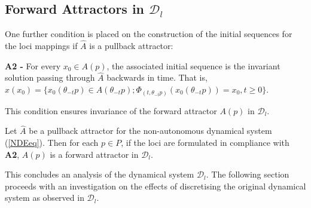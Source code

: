 \subsection{Forward Attractors in $\mathcal{D}_l$}

One further condition is placed on the construction of the initial sequences
for the loci mappings if $\hat{A}$ is a pullback attractor:

\textbf{A2 - } For every $x_0 \in A(p)$, the associated initial sequence is the
invariant solution passing through $\hat{A}$ backwards in time. That is,
$\hat{x}(x_0) = \{x_0(\theta_{-t}p) \in A(\theta_{-t}p); \Phi_{(t, \theta_{-t}p)
}(x_0(\theta_{-t}p)) = x_0, t \geq 0 \}$.

This condition ensures invariance of the forward attractor $A(p)$ in
$\mathcal{D}_l$.

\begin{lemma}
Let $\hat{A}$ be a pullback attractor for the non-autonomous dynamical system
(\ref{NDEeq}). Then for each $p \in P$, if the loci are formulated in
compliance with \textbf{A2}, $A(p)$ is a forward attractor in $\mathcal{D}_l$.
\end{lemma}

This concludes an analysis of the dynamical system $\mathcal{D}_l$. The
following section proceeds with an investigation on the effects of discretising
the original dynamical system as observed in $\mathcal{D}_l$.

\endinput

